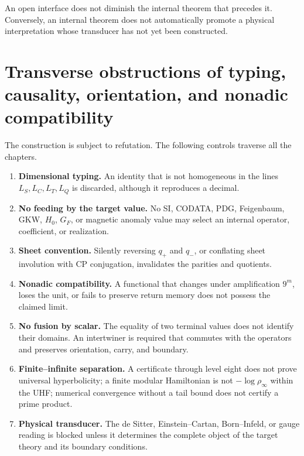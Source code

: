 An open interface does not diminish the internal theorem that precedes it. Conversely,
an internal theorem does not automatically promote a physical interpretation
whose transducer has not yet been constructed.

\section{Transverse obstructions of typing, causality, orientation, and nonadic compatibility}

The construction is subject to refutation. The following
controls traverse all the chapters.

\begin{enumerate}[label=F\arabic*.]
\item \textbf{Dimensional typing.} An identity that is not homogeneous in the
lines \(L_S,L_C,L_T,L_Q\) is discarded, although it reproduces a decimal.

\item \textbf{No feeding by the
target value.} No SI, CODATA, PDG, Feigenbaum, GKW,
\(H_0\), \(G_F\), or magnetic
anomaly value may select an internal operator, coefficient, or
realization.

\item \textbf{Sheet convention.} Silently reversing \(q_+\) and
\(q_-\), or conflating sheet involution with CP conjugation, invalidates the
parities and quotients.

\item \textbf{Nonadic compatibility.} A functional that changes under
amplification \(9^m\), loses the unit, or fails to preserve return memory
does not possess the claimed limit.

\item \textbf{No fusion by scalar.} The equality of two terminal values
does not identify their domains. An intertwiner is required that commutes with the
operators and preserves orientation, carry, and boundary.

\item \textbf{Finite--infinite separation.} A certificate through level eight
does not prove universal hyperbolicity; a finite modular Hamiltonian is not
\(-\log\rho_\infty\) within the UHF; numerical convergence without a tail
bound does not certify a prime product.

\item \textbf{Physical transducer.} The de Sitter, Einstein--Cartan,
Born--Infeld, or gauge reading is blocked unless it determines the complete object of the
target theory and its boundary conditions.
\end{enumerate}

